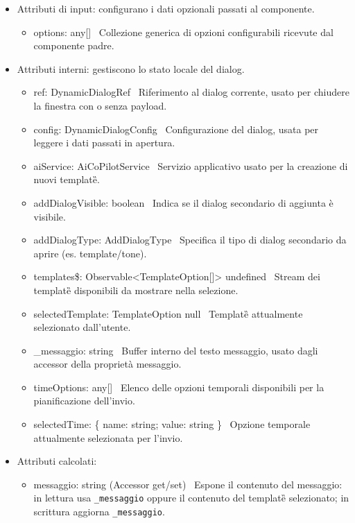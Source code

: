 \documentclass[a4paper,11pt]{article}
\begin{document}
\begin{itemize}[noitemsep, topsep=0pt]
\item Attributi di input: configurano i dati opzionali passati al componente.
\begin{itemize}
\item options: any[] \
Collezione generica di opzioni configurabili ricevute dal componente padre.
\end{itemize}
\item Attributi interni: gestiscono lo stato locale del dialog.
\begin{itemize}
\item ref: DynamicDialogRef  \
Riferimento al dialog corrente, usato per chiudere la finestra con o senza payload.
  \item config: DynamicDialogConfig  \
  Configurazione del dialog, usata per leggere i dati passati in apertura.

  \item aiService: AiCoPilotService  \
  Servizio applicativo usato per la creazione di nuovi template\G{}.

  \item addDialogVisible: boolean  \
  Indica se il dialog secondario di aggiunta è visibile.

  \item addDialogType: AddDialogType  \
  Specifica il tipo di dialog secondario da aprire (es. template/tone).

  \item templates\$: Observable<TemplateOption[]> \textbar{} undefined  \
  Stream dei template\G{} disponibili da mostrare nella selezione.

  \item selectedTemplate: TemplateOption \textbar{} null  \
  Template\G{} attualmente selezionato dall'utente.

  \item \_messaggio: string  \
  Buffer interno del testo messaggio, usato dagli accessor della proprietà messaggio.

  \item timeOptions: any[]  \
  Elenco delle opzioni temporali disponibili per la pianificazione dell'invio.

  \item selectedTime: \{ name: string; value: string \}  \
  Opzione temporale attualmente selezionata per l'invio.
\end{itemize}
\item Attributi calcolati:
\begin{itemize}
\item messaggio: string (Accessor get/set) \
Espone il contenuto del messaggio: in lettura usa \texttt{_messaggio} oppure il contenuto del template\G{} selezionato; in scrittura aggiorna \texttt{_messaggio}.
\end{itemize}
\end{itemize}
\end{document}
